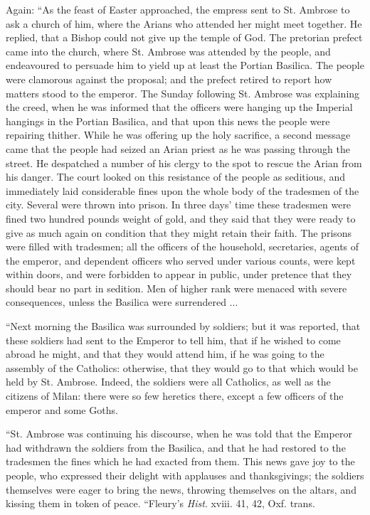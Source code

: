 Again: ``As the feast of Easter approached, the empress sent to
St. Ambrose to ask a church of him, where the Arians who attended her
might meet together. He replied, that a Bishop could not give up the
temple of God. The pretorian prefect came into the church, where St.
Ambrose was attended by the people, and endeavoured to persuade him to
yield up at least the Portian Basilica. The people were clamorous
against the proposal; and the prefect retired to report how matters
stood to the emperor. The Sunday following St. Ambrose was explaining
the creed, when he was informed that the officers were hanging up the
Imperial hangings in the Portian Basilica, and that upon this news the
people were repairing thither. While he was offering up the holy
sacrifice, a second message came that the people had seized an Arian
priest as he was passing through the street. He despatched a number of
his clergy to the spot to rescue the Arian from his danger. The court
looked on this resistance of the people as seditious, and immediately
laid considerable fines upon the whole body of the tradesmen of
the city. Several were thrown into prison. In three days' time these
tradesmen were fined two hundred pounds weight of gold, and they said
that they were ready to give as much again on condition that they
might retain their faith. The prisons were filled with tradesmen; all
the officers of the household, secretaries, agents of the emperor, and
dependent officers who served under various counts, were kept within
doors, and were forbidden to appear in public, under pretence that
they should bear no part in sedition. Men of higher rank were menaced
with severe consequences, unless the Basilica were surrendered ...

``Next morning the Basilica was surrounded by soldiers; but it
was reported, that these soldiers had sent to the Emperor to tell him,
that if he wished to come abroad he might, and that they would attend
him, if he was going to the assembly of the Catholics: otherwise, that
they would go to that which would be held by St. Ambrose. Indeed, the
soldiers were all Catholics, as well as the citizens of Milan: there
were so few heretics there, except a few officers of the emperor and
some Goths.

``St. Ambrose was continuing his discourse, when he was told
that the Emperor had withdrawn the soldiers from the Basilica, and
that he had restored to the tradesmen the fines which he had exacted
from them. This news gave joy to the people, who expressed their
delight with applauses and thanksgivings; the soldiers themselves were
eager to bring the news, throwing themselves on the altars, and
kissing them in token of peace. ``Fleury's \emph{Hist}. xviii. 41,
42, Oxf. trans.

